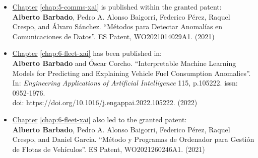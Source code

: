 \begin{itemize}
\item \hyperref[chap:5-comms-xai]{Chapter} \ref{chap:5-comms-xai} is published within the granted patent:
\\\textbf{Alberto Barbado}, Pedro A. Alonso Baigorri, Federico Pérez, Raquel Crespo, and Álvaro Sánchez. “Métodos para Detectar Anomalías en Comunicaciones de Datos”. ES Patent, WO2021014029A1. (2021)

\item \hyperref[chap:6-fleet-xai]{Chapter} \ref{chap:6-fleet-xai} has been published in:
\\\textbf{Alberto Barbado} and Óscar Corcho. “Interpretable Machine Learning Models for Predicting and Explaining Vehicle Fuel Consumption Anomalies”. \\In: \textit{Engineering Applications of Artificial Intelligence} 115, p.105222. issn: 0952-1976. \\doi: https://doi.org/10.1016/j.engappai.2022.105222. (2022)

\item \hyperref[chap:6-fleet-xai]{Chapter} \ref{chap:6-fleet-xai} also led to the granted patent:
\\\textbf{Alberto Barbado}, Pedro A. Alonso Baigorri, Federico Pérez, Raquel Crespo, and Daniel  Garcia. “Método  y  Programas  de  Ordenador  para  Gestión  de  Flotas  de Vehículos”. ES Patent, WO2021260246A1. (2021)


\end{itemize}

\newpage

